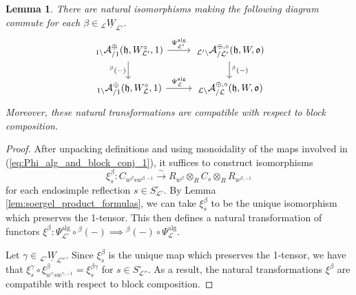 \documentclass{amsart}
\newcommand{\scrL}{\mathcal{L}}
\newcommand{\fr}[1]{\mathfrak{#1}}
\DeclareMathOperator{\alg}{alg}
\newcommand{\Amon}[2]{\:_{#1 \backslash} \mathcal{A}_{/ #2} }
\newcommand{\uW}[2]{{}_{#1}\underline{W}_{#2}}
\newtheorem{lemma}[subsubsection]{Lemma}
\theoremstyle{definition}
\numberwithin{equation}{subsection}
\begin{document}
\begin{lemma}\label{lem:Phi_alg_and_block_conj}
    There are natural isomorphisms making the following diagram commute for each $\beta \in \uW{\scrL}{\scrL'}$.
    \begin{equation}\label{eq:Phi_alg_and_block_conj_1}
        \begin{tikzcd}
            {\Amon{1}{1}^{\oplus} (\fr{h}, W_{\scrL'}^{\circ}, 1)} \arrow[d, "{}^{\beta} (-)"'] \arrow[r, "\Psi_{\scrL'}^{\alg}"] & {\Amon{\scrL'}{\scrL'}^{\oplus, \circ} (\fr{h}, W, \fr{o})} \arrow[d, "{}^{\beta} (-)"] \\
            {\Amon{1}{1}^{\oplus} (\fr{h}, W_{\scrL}^{\circ}, 1)} \arrow[r, "\Psi_{\scrL}^{\alg}"]                            & {\Amon{\scrL}{\scrL}^{\oplus,\circ} (\fr{h}, W, \fr{o})}                           
            \end{tikzcd}
    \end{equation}
    Moreover, these natural transformations are compatible with respect to block composition.
\end{lemma}
\begin{proof} 
    After unpacking definitions and using monoidality of the maps involved in (\ref{eq:Phi_alg_and_block_conj_1}), it suffices to construct isomorphisms
    \[\xi_s^{\beta} : C_{w^{\beta} s w^{\beta, -1}} \stackrel{\sim}{\to} R_{w^{\beta}} \otimes_R C_s \otimes_R R_{w^{\beta, -1}}\]
    for each endosimple reflection $s \in S_{\scrL'}^{\circ}$. By Lemma \ref{lem:soergel_product_formulas}, we can take $\xi_s^{\beta}$ to be the unique isomorphism which preserves the 1-tensor.
    This then defines a natural transformation of functors $\xi^{\beta} : \Psi_{\scrL'}^{\alg} \circ {}^{\beta} (-) \implies {}^{\beta} (-) \circ \Psi_{\scrL}^{\alg} $.

    Let $\gamma \in \uW{\scrL'}{\scrL''}$.
    Since $\xi_s^{\beta}$ is the unique map which preserves the 1-tensor, we have that 
    $\xi_s^{\gamma} \circ \xi_{w^{\gamma} s w^{\gamma, -1}}^{\beta} = \xi_s^{\beta \gamma}$ for $s \in S_{\scrL''}^{\circ}$. As a result, the natural transformations $\xi^{\beta}$ are compatible with respect to block composition.
\end{proof}
\end{document}
